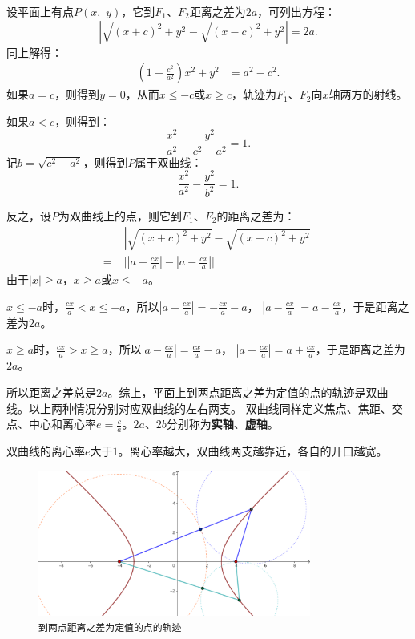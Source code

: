 \documentclass[12pt,UTF8]{ctexbook}
\theoremstyle{definition}
\theoremstyle{plain}
\begin{document}
设平面上有点$P(x, \,\,y)$，它到$F_1$、$F_2$距离之差为$2a$，可列出方程：
$$ \left|\sqrt{(x + c)^2 + y^2} - \sqrt{(x - c)^2 + y^2}\right| = 2a.$$
同上解得：
\begin{align*}
    \left(1 - \frac{c^2}{a^2}\right)x^2 + y^2 &= a^2 - c^2.
\end{align*}
如果$a = c$，则得到$y = 0$，从而$x \leqslant -c$或$x \geqslant c$，轨迹为$F_1$、$F_2$向$x$轴两方的射线。

如果$a < c$，则得到：
$$ \frac{x^2}{a^2} - \frac{y^2}{c^2 - a^2} = 1.$$
记$b = \sqrt{c^2 - a^2}$，则得到$P$属于双曲线：
$$ \frac{x^2}{a^2} - \frac{y^2}{b^2} = 1.$$

反之，设$P$为双曲线上的点，则它到$F_1$、$F_2$的距离之差为：
\begin{align*}
    &\;\left|\sqrt{(x + c)^2 + y^2} - \sqrt{(x - c)^2 + y^2}\right|  \\
    =&\; \Bigg|\left|a + \frac{cx}{a}\right| - \left|a - \frac{cx}{a}\right|\Bigg|
\end{align*}
由于$|x| \geqslant a$，$x \geqslant a$或$x \leqslant -a$。

$x \leqslant -a$时，$\frac{cx}{a} < x \leqslant -a$，所以$\left|a + \frac{cx}{a}\right| = -\frac{cx}{a} - a$，
$\left|a - \frac{cx}{a}\right| = a - \frac{cx}{a}$，于是距离之差为$2a$。

$x \geqslant a$时，$\frac{cx}{a} > x \geqslant a$，所以$\left|a - \frac{cx}{a}\right| = \frac{cx}{a} - a$，
$\left|a + \frac{cx}{a}\right| = a + \frac{cx}{a}$，于是距离之差为$2a$。

所以距离之差总是$2a$。综上，平面上到两点距离之差为定值的点的轨迹是双曲线。以上两种情况分别对应双曲线的左右两支。
双曲线同样定义焦点、焦距、交点、中心和离心率$\displaystyle e =\frac{c}{a}$。$2a$、$2b$分别称为\textbf{实轴}、\textbf{虚轴}。

双曲线的离心率$e$大于$1$。离心率越大，双曲线两支越靠近，各自的开口越宽。

\begin{figure}[h] 
    \centering
    \includegraphics[width=0.8\textwidth]{tu/双曲线第一定义.png}
    \caption*{\texttt{到两点距离之差为定值的点的轨迹}}
\end{figure}
\end{document}
